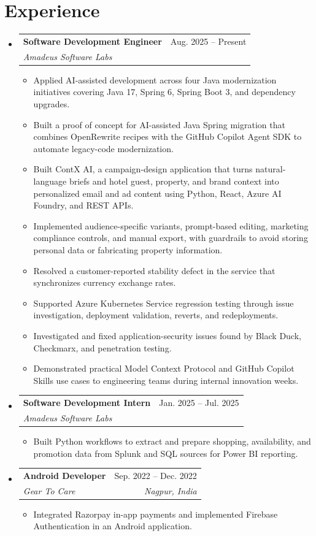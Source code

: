 \documentclass[a4paper,11pt]{article}
\makeatletter
\newcommand{\entry}[4]{\item\begin{tabularx}{\textwidth}{@{}Xr@{}}\textbf{#1}& #2\\\textit{\small #3}&\textit{\small #4}\end{tabularx}\vspace{-5pt}}
\newcommand{\bulletpoint}[1]{\item\small{#1}}
\makeatother
\begin{document}
\section{Experience}
\begin{itemize}[leftmargin=0in,label={}]
  \entry{Software Development Engineer}{Aug. 2025 -- Present}{Amadeus Software Labs}{}
  \begin{itemize}
    \bulletpoint{Applied AI-assisted development across four Java modernization initiatives covering Java 17, Spring 6, Spring Boot 3, and dependency upgrades.}
    \bulletpoint{Built a proof of concept for AI-assisted Java Spring migration that combines OpenRewrite recipes with the GitHub Copilot Agent SDK to automate legacy-code modernization.}
    \bulletpoint{Built ContX AI, a campaign-design application that turns natural-language briefs and hotel guest, property, and brand context into personalized email and ad content using Python, React, Azure AI Foundry, and REST APIs.}
    \bulletpoint{Implemented audience-specif{}ic variants, prompt-based editing, marketing compliance controls, and manual export, with guardrails to avoid storing personal data or fabricating property information.}
    \bulletpoint{Resolved a customer-reported stability defect in the service that synchronizes currency exchange rates.}
    \bulletpoint{Supported Azure Kubernetes Service regression testing through issue investigation, deployment validation, reverts, and redeployments.}
    \bulletpoint{Investigated and f{}ixed application-security issues found by Black Duck, Checkmarx, and penetration testing.}
    \bulletpoint{Demonstrated practical Model Context Protocol and GitHub Copilot Skills use cases to engineering teams during internal innovation weeks.}
  \end{itemize}
  \entry{Software Development Intern}{Jan. 2025 -- Jul. 2025}{Amadeus Software Labs}{}
  \begin{itemize}
    \bulletpoint{Built Python workf{}lows to extract and prepare shopping, availability, and promotion data from Splunk and SQL sources for Power BI reporting.}
  \end{itemize}
  \entry{Android Developer}{Sep. 2022 -- Dec. 2022}{Gear To Care}{Nagpur, India}
  \begin{itemize}
    \bulletpoint{Integrated Razorpay in-app payments and implemented Firebase Authentication in an Android application.}
  \end{itemize}
\end{itemize}
\end{document}
